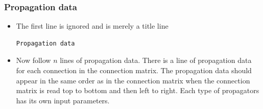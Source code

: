 \documentclass[12pt,a4paper]{article}
\begin{document}
\subsubsection{Propagation data}
\label{sec:prop}
\begin{itemize}
\item The first line is ignored and is merely a title line
\begin{lstlisting}
Propagation data
\end{lstlisting}
\item Now follow $n$ lines of propagation data. There is a line of propagation data for each connection in the connection matrix. The propagation data should appear in the same order as in the connection matrix when the connection matrix is read top to bottom and then left to right. Each type of propagators has its own input parameters.
\end{itemize}
\end{document}
